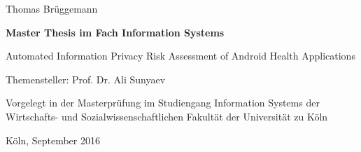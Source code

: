 \vspace*{1mm}

\thispagestyle{empty}
Thomas Brüggemann

\vspace*{23mm}

\begin{center}
\textbf{
    Master Thesis
\linebreak
    im Fach Information Systems}
\end{center}

\vspace*{20mm}

\begin{center}
\LARGE 
    Automated Information Privacy Risk Assessment of Android Health Applications
\end{center}

\vspace*{8mm}

\begin{center}
    Themensteller: Prof. Dr. Ali Sunyaev
\end{center}

\vspace*{12mm}

\begin{center}
    Vorgelegt in der Masterprüfung
\linebreak
    im Studiengang Information Systems
\linebreak
    der Wirtschafts- und Sozialwissenschaftlichen Fakultät
\linebreak
    der Universität zu Köln
\end{center}

\vspace*{30mm}

\begin{center}
Köln, September 2016
\end{center}


